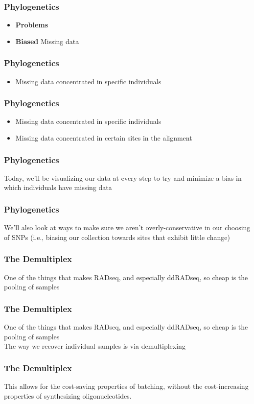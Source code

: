 \documentclass{beamer}
\begin{document}
\begin{frame}
\frametitle{Phylogenetics}
\begin{itemize}
\item \textbf{Problems}
\item \textbf{Biased} Missing data
\end{itemize}
\end{frame}

\begin{frame}
\frametitle{Phylogenetics}
\begin{itemize}
\item Missing data concentrated in specific individuals
\end{itemize}
\end{frame}

\begin{frame}
\frametitle{Phylogenetics}
\begin{itemize}
\item Missing data concentrated in specific individuals
\item Missing data concentrated in certain sites in the alignment
\end{itemize}
\end{frame}

\begin{frame}
\frametitle{Phylogenetics}
Today, we'll be visualizing our data at every step to try and minimize a bias in which individuals have missing data
\end{frame}

\begin{frame}
\frametitle{Phylogenetics}
We'll also look at ways to make sure we aren't overly-conservative in our choosing of SNPs (i.e., biasing our collection towards sites that exhibit little change)
\end{frame}

\begin{frame}
\frametitle{The Demultiplex}
One of the things that makes RADseq, and especially ddRADseq, so cheap is the pooling of samples
\end{frame}

\begin{frame}
\frametitle{The Demultiplex}
One of the things that makes RADseq, and especially ddRADseq, so cheap is the pooling of samples \\
The way we recover individual samples is via demultiplexing
\end{frame}

\begin{frame}
\frametitle{The Demultiplex}
This allows for the cost-saving properties of batching, without the cost-increasing properties of synthesizing oligonucleotides. 
\end{frame}
\end{document}
